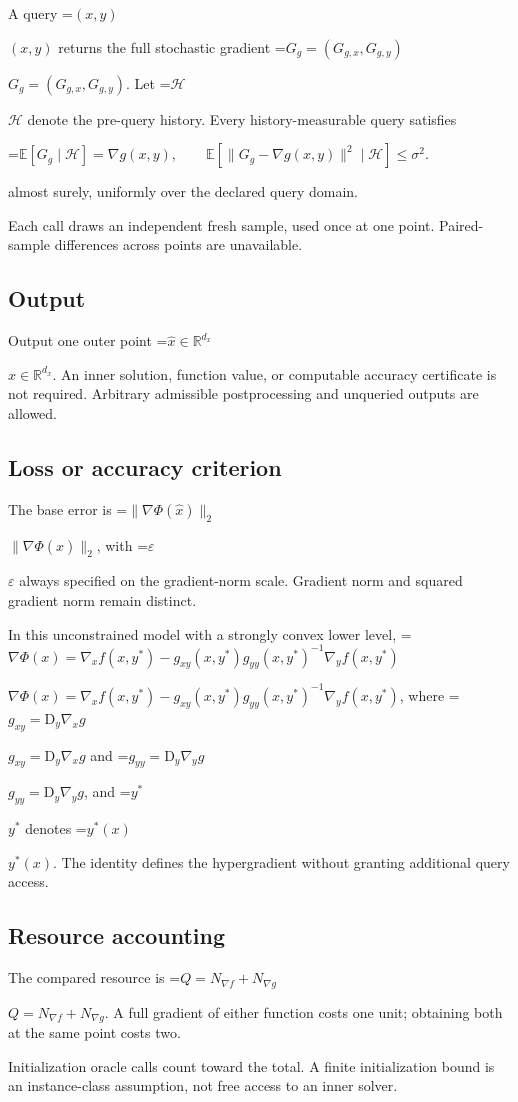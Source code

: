 \documentclass[10pt,a4paper]{article}
\newcommand{\AtlasMath}[1]{\par\begingroup\centering\setbox0=\hbox{$\displaystyle #1$}\ifdim\wd0>1.4\linewidth\typeout{ATLAS WIDE FORMULA: \the\wd0}\fi\ifdim\wd0>\linewidth\resizebox{\linewidth}{!}{\box0}\else\box0\fi\par\endgroup}
\newcommand{\AtlasInlineMath}[1]{\begingroup\setbox0=\hbox{$#1$}\ifdim\wd0>.4\linewidth\endgroup\AtlasMath{#1}\else\endgroup$#1$\fi}
\begin{document}
A query \AtlasInlineMath{(x,y)} returns the full stochastic gradient \AtlasInlineMath{G_g=(G_{g,x},G_{g,y})}. Let \AtlasInlineMath{\mathcal{H}} denote the pre-query history. Every history-measurable query satisfies 
\AtlasMath{\mathbb{E}[G_g\mid\mathcal{H}]=\nabla g(x,y),\qquad
\mathbb{E}[\|G_g-\nabla g(x,y)\|^2\mid\mathcal{H}]\le\sigma^2.}
 almost surely, uniformly over the declared query domain.

Each call draws an independent fresh sample, used once at one point. Paired-sample differences across points are unavailable.

\subsection{Output}
Output one outer point \AtlasInlineMath{\widehat{x}\in\mathbb{R}^{d_x}}. An inner solution, function value, or computable accuracy certificate is not required. Arbitrary admissible postprocessing and unqueried outputs are allowed.

\subsection{Loss or accuracy criterion}
The base error is \AtlasInlineMath{\|\nabla\Phi(\widehat{x})\|_2}, with \AtlasInlineMath{\varepsilon} always specified on the gradient-norm scale. Gradient norm and squared gradient norm remain distinct.

In this unconstrained model with a strongly convex lower level, \AtlasInlineMath{\nabla\Phi(x)=\nabla_x f(x,y^*)-g_{xy}(x,y^*)g_{yy}(x,y^*)^{-1}\nabla_y f(x,y^*)}, where \AtlasInlineMath{g_{xy}=\mathrm{D}_y\nabla_x g} and \AtlasInlineMath{g_{yy}=\mathrm{D}_y\nabla_y g}, and \AtlasInlineMath{y^*} denotes \AtlasInlineMath{y^*(x)}. The identity defines the hypergradient without granting additional query access.

\subsection{Resource accounting}
The compared resource is \AtlasInlineMath{Q=N_{\nabla f}+N_{\nabla g}}. A full gradient of either function costs one unit; obtaining both at the same point costs two.

Initialization oracle calls count toward the total. A finite initialization bound is an instance-class assumption, not free access to an inner solver.
\end{document}
